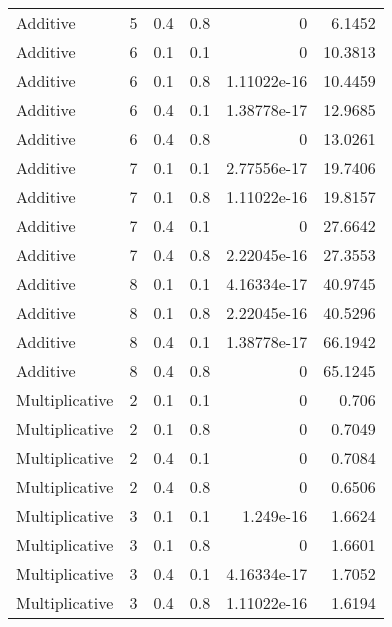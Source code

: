 \documentclass{article}
\begin{document}
\begin{figure}[H]
\begin{tabular}{lrrrrr}
 Additive       &       5 &   0.4 &            0.8 & 0           &            6.1452 \\
 Additive       &       6 &   0.1 &            0.1 & 0           &           10.3813 \\
 Additive       &       6 &   0.1 &            0.8 & 1.11022e-16 &           10.4459 \\
 Additive       &       6 &   0.4 &            0.1 & 1.38778e-17 &           12.9685 \\
 Additive       &       6 &   0.4 &            0.8 & 0           &           13.0261 \\
 Additive       &       7 &   0.1 &            0.1 & 2.77556e-17 &           19.7406 \\
 Additive       &       7 &   0.1 &            0.8 & 1.11022e-16 &           19.8157 \\
 Additive       &       7 &   0.4 &            0.1 & 0           &           27.6642 \\
 Additive       &       7 &   0.4 &            0.8 & 2.22045e-16 &           27.3553 \\
 Additive       &       8 &   0.1 &            0.1 & 4.16334e-17 &           40.9745 \\
 Additive       &       8 &   0.1 &            0.8 & 2.22045e-16 &           40.5296 \\
 Additive       &       8 &   0.4 &            0.1 & 1.38778e-17 &           66.1942 \\
 Additive       &       8 &   0.4 &            0.8 & 0           &           65.1245 \\
 Multiplicative &       2 &   0.1 &            0.1 & 0           &            0.706  \\
 Multiplicative &       2 &   0.1 &            0.8 & 0           &            0.7049 \\
 Multiplicative &       2 &   0.4 &            0.1 & 0           &            0.7084 \\
 Multiplicative &       2 &   0.4 &            0.8 & 0           &            0.6506 \\
 Multiplicative &       3 &   0.1 &            0.1 & 1.249e-16   &            1.6624 \\
 Multiplicative &       3 &   0.1 &            0.8 & 0           &            1.6601 \\
 Multiplicative &       3 &   0.4 &            0.1 & 4.16334e-17 &            1.7052 \\
 Multiplicative &       3 &   0.4 &            0.8 & 1.11022e-16 &            1.6194 \\

\end{tabular}
\end{figure}
\end{document}
